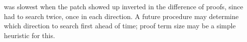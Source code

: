 \sysname was slowest %
when the patch showed up inverted in the difference of proofs,
since \sysname had to search twice, once in each direction.
A future procedure may %
determine which direction to search first ahead of time; proof term size may be a simple heuristic for this.











